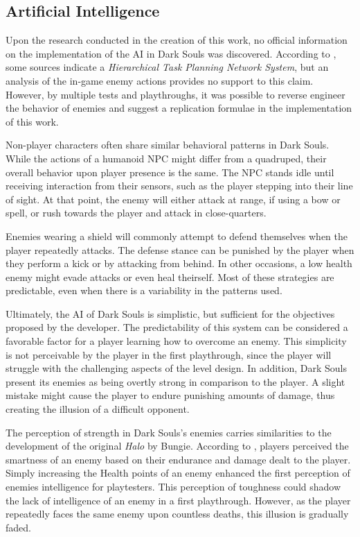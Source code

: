\subsection{Artificial Intelligence}

Upon the research conducted in the creation of this work, no official information on the implementation of the AI in Dark Souls was discovered. According to , some sources indicate a \emph{Hierarchical Task Planning Network System}, but an analysis of the in-game enemy actions provides no support to this claim. However, by multiple tests and playthroughs, it was possible to reverse engineer the behavior of enemies and suggest a replication formulae in the implementation of this work.

Non-player characters often share similar behavioral patterns in Dark Souls. While the actions of a humanoid NPC might differ from a quadruped, their overall behavior upon player presence is the same. The NPC stands idle until receiving interaction from their sensors, such as the player stepping into their line of sight. At that point, the enemy will either attack at range, if using a bow or spell, or rush towards the player and attack in close-quarters.

Enemies wearing a shield will commonly attempt to defend themselves when the player repeatedly attacks. The defense stance can be punished by the player when they perform a kick or by attacking from behind. In other occasions, a low health enemy might evade attacks or even heal theirself. Most of these strategies are predictable, even when there is a variability in the patterns used.

Ultimately, the AI of Dark Souls is simplistic, but sufficient for the objectives proposed by the developer. The predictability of this system can be considered a favorable factor for a player learning how to overcome an enemy. This simplicity is not perceivable by the player in the first playthrough, since the player will struggle with the challenging aspects of the level design. In addition, Dark Souls present its enemies as being overtly strong in comparison to the player. A slight mistake might cause the player to endure punishing amounts of damage, thus creating the illusion of a difficult opponent.

The perception of strength in Dark Souls's enemies carries similarities to the development of the original \emph{Halo} by Bungie. According to , players perceived the smartness of an enemy based on their endurance and damage dealt to the player. Simply increasing the Health points of an enemy enhanced the first perception of enemies intelligence for playtesters. This perception of toughness could shadow the lack of intelligence of an enemy in a first playthrough. However, as the player repeatedly faces the same enemy upon countless deaths, this illusion is gradually faded.


